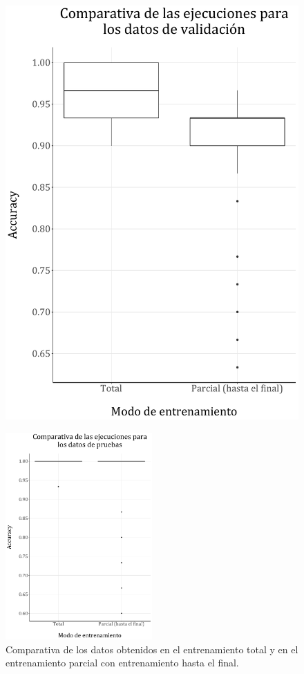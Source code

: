 \documentclass[spanish,a4paper,12pt,twoside]{report}
\begin{document}
\begin{figure}[H]
\begin{minipage}{0.49\textwidth}
      \includegraphics[width = 1\linewidth]{resources/Fig20_2.pdf}
    \end{minipage}
  \end{figure}
  \begin{figure}[H]
    \centering
    \includegraphics[width = 0.5\textwidth]{resources/Fig20_3.pdf}
    \caption{Comparativa de los datos obtenidos en el entrenamiento total y en el entrenamiento parcial con entrenamiento hasta el final.}
    \label{fig:20}
  \end{figure} \par
\end{document}
